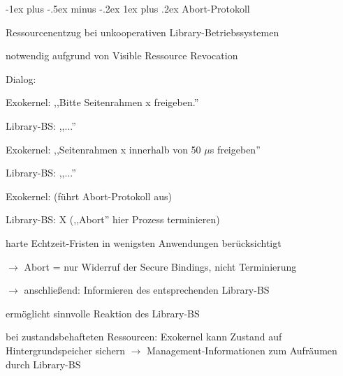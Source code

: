 \documentclass[a4paper]{article}
\makeatletter
\renewcommand{\subsubsection}{\@startsection{subsubsection}{3}{0mm}%
 {-1ex plus -.5ex minus -.2ex}%
 {1ex plus .2ex}%
 {\normalfont\small\bfseries}}
\makeatother
\begin{document}
\begin{multicols}{3}
    \subsubsection{Abort-Protokoll}
    \begin{itemize*}
        \item Ressourcenentzug bei unkooperativen Library-Betriebssystemen
        \item notwendig aufgrund von Visible Ressource Revocation
        \item Dialog:
        \begin{itemize*}
            \item Exokernel: ,,Bitte Seitenrahmen x freigeben.''
            \item Library-BS: ,,...''
            \item Exokernel: ,,Seitenrahmen x innerhalb von 50 $\mu$s freigeben''
            \item Library-BS: ,,...''
            \item Exokernel: (führt Abort-Protokoll aus)
            \item Library-BS: X (,,Abort'' hier Prozess terminieren)
        \end{itemize*}
        \item harte Echtzeit-Fristen in wenigsten Anwendungen berücksichtigt
        \item[$\rightarrow$] Abort = nur Widerruf der Secure Bindings, nicht Terminierung%
        \item[$\rightarrow$] anschließend: Informieren des entsprechenden Library-BS
        \item ermöglicht sinnvolle Reaktion des Library-BS %
        \item bei zustandsbehafteten Ressourcen: Exokernel kann Zustand auf Hintergrundspeicher sichern $\rightarrow$ Management-Informationen zum Aufräumen durch Library-BS
    \end{itemize*}


\end{multicols}
\end{document}
